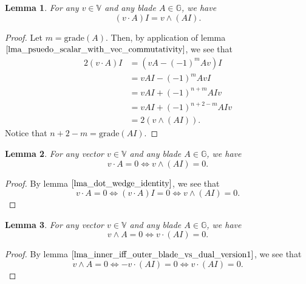 \documentclass{article}
\newcommand{\V}{\mathbb{V}}
\newcommand{\G}{\mathbb{G}}
\newcommand{\grade}{\mbox{grade}}
\newtheorem{lemma}{Lemma}[section]
\begin{document}
\begin{lemma}\label{lma_dot_wedge_identity}
For any $v\in\V$ and any blade $A\in\G$, we have
\begin{equation*}
(v\cdot A)I = v\wedge(AI).
\end{equation*}
\end{lemma}
\begin{proof}
Let $m=\grade(A)$.  Then, by application of lemma $\eqref{lma_psuedo_scalar_with_vec_commutativity}$,
we see that
\begin{align*}
2(v\cdot A)I &= (vA-(-1)^mAv)I \\
 &= vAI-(-1)^mAvI \\
 &= vAI+(-1)^{n+m}AIv \\
 &= vAI+(-1)^{n+2-m}AIv \\
 &= 2(v\wedge(AI)).
\end{align*}
Notice that $n+2-m=\grade(AI)$.
\end{proof}

\begin{lemma}\label{lma_inner_iff_outer_blade_vs_dual_version1}
For any vector $v\in\V$ and any blade $A\in\G$, we have
\begin{equation*}
v\cdot A=0 \iff v\wedge(AI)=0.
\end{equation*}
\end{lemma}
\begin{proof}
By lemma $\eqref{lma_dot_wedge_identity}$, we see that
\begin{equation*}
v\cdot A=0 \iff (v\cdot A)I=0 \iff v\wedge(AI)=0.
\end{equation*}
\end{proof}

\begin{lemma}\label{lma_inner_iff_outer_blade_vs_dual_version2}
For any vector $v\in\V$ and any blade $A\in\G$, we have
\begin{equation*}
v\wedge A=0 \iff v\cdot(AI)=0.
\end{equation*}
\end{lemma}
\begin{proof}
By lemma $\eqref{lma_inner_iff_outer_blade_vs_dual_version1}$, we see that
\begin{equation*}
v\wedge A=0 \iff -v\cdot(AI)=0 \iff v\cdot(AI)=0.
\end{equation*}
\end{proof}
\end{document}
